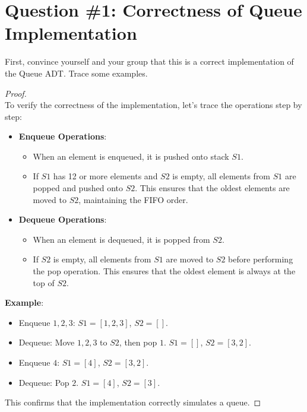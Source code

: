 \documentclass[12pt]{article}
\begin{document}
\renewcommand{\familydefault}{\rmdefault}



\pagebreak
\normalsize

\section*{Question \#1: Correctness of Queue Implementation}
First, convince yourself and your group that this is a correct implementation of the Queue ADT. Trace some examples.

\begin{proof}
\leavevmode\\
To verify the correctness of the implementation, let's trace the operations step by step:

\begin{itemize}
    \item \textbf{Enqueue Operations}:
    \begin{itemize}
        \item When an element is enqueued, it is pushed onto stack \( S1 \).
        \item If \( S1 \) has 12 or more elements and \( S2 \) is empty, all elements from \( S1 \) are popped and pushed onto \( S2 \). This ensures that the oldest elements are moved to \( S2 \), maintaining the FIFO order.
    \end{itemize}

    \item \textbf{Dequeue Operations}:
    \begin{itemize}
        \item When an element is dequeued, it is popped from \( S2 \).
        \item If \( S2 \) is empty, all elements from \( S1 \) are moved to \( S2 \) before performing the pop operation. This ensures that the oldest element is always at the top of \( S2 \).
    \end{itemize}
\end{itemize}

\noindent
\textbf{Example}:
\begin{itemize}
    \item Enqueue \( 1, 2, 3 \): \( S1 = [1, 2, 3] \), \( S2 = [] \).
    \item Dequeue: Move \( 1, 2, 3 \) to \( S2 \), then pop \( 1 \). \( S1 = [] \), \( S2 = [3, 2] \).
    \item Enqueue \( 4 \): \( S1 = [4] \), \( S2 = [3, 2] \).
    \item Dequeue: Pop \( 2 \). \( S1 = [4] \), \( S2 = [3] \).
\end{itemize}

This confirms that the implementation correctly simulates a queue.
\end{proof}
\pagebreak
\end{document}
